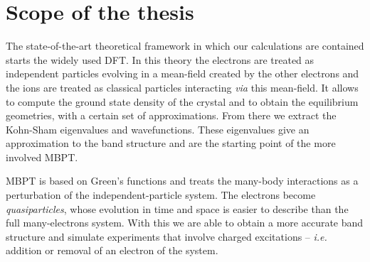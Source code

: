 




\section*{Scope of the thesis}
%
The state-of-the-art theoretical framework in which our calculations are contained starts the widely used \acrfull{DFT}.\cite{kohn1996density} In this theory the electrons are treated as independent particles evolving in a mean-field created by the other electrons and the ions are treated as classical particles interacting \textit{via} this mean-field. It allows to compute the ground state density of the crystal and to obtain the equilibrium geometries, with a certain set of approximations. From there we extract the Kohn-Sham eigenvalues and wavefunctions. These eigenvalues give an approximation to the band structure and are the starting point of the more involved \acrfull{MBPT}. 

\acrshort{MBPT} is based on Green's functions and treats the many-body interactions as a perturbation of the independent-particle system. The electrons become \textit{quasiparticles}, whose evolution in time and space is easier to describe than the full many-electrons system.\cite{hedin1965new,aryasetiawan1998gw}
With this we are able to obtain a more accurate band structure and simulate experiments that involve charged excitations -- \textit{i.e.} addition or removal of an electron of the system. 

